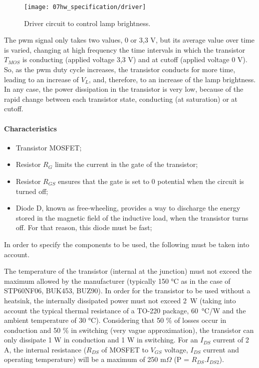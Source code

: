 \begin{figure}[H]
	\centering
	\texttt{[image: 07hw\_specification/driver]}
	\caption{Driver circuit to control lamp brightness.}
	\label{fig:driver}
\end{figure}

The \ac{pwm} signal only takes two values, 0 or 3,3 V, but its average value over time is varied, changing at high frequency the time intervals in which the transistor \(T_{MOS}\) is conducting (applied voltage 3,3 V) and at cutoff (applied voltage 0 V). So, as the \ac{pwm} duty cycle increases, the transistor conducts for more time, leading to an increase of \(V_{L}\), and, therefore, to an increase of the lamp brightness. In any case, the power dissipation in the transistor is very low, because of the rapid change between each transistor state, conducting (at saturation) or at cutoff.

\paragraph*{Characteristics}
\begin{itemize}
	\item Transistor MOSFET;
	\item Resistor \(R_{G}\) limits the current in the gate of the transistor;
	\item Resistor \(R_{GS}\) ensures that the gate is set to 0 potential when the circuit is turned off;
	\item Diode D, known as free-wheeling, provides a way to discharge the energy stored in the magnetic field of the inductive load, when the transistor turns off. For that reason, this diode must be fast;
\end{itemize}

In order to specify the components to be used, the following must be taken into account.

The temperature of the transistor (internal at the junction) must not exceed the maximum allowed by the manufacturer (typically 150 °C as in the case of STP60NF06, BUK453, BUZ90). In order for the transistor to be used without a heatsink, the internally dissipated power must not exceed 2~W (taking into account the typical thermal resistance of a TO-220 package, 60~°C/W and the ambient temperature of 30 °C). Considering that 50 \% of losses occur in conduction and 50  \% in switching (very vague approximation), the transistor can only dissipate 1 W in conduction and 1 W in switching. For an \(I_{DS}\) current of 2 A, the internal resistance (\(R_{DS}\) of MOSFET to \(V_{GS}\) voltage, \(I_{DS}\) current and operating temperature) will be a maximum of 250 m$\Omega$ (P = \(R_{DS}\).\(I_{DS2}\)).

